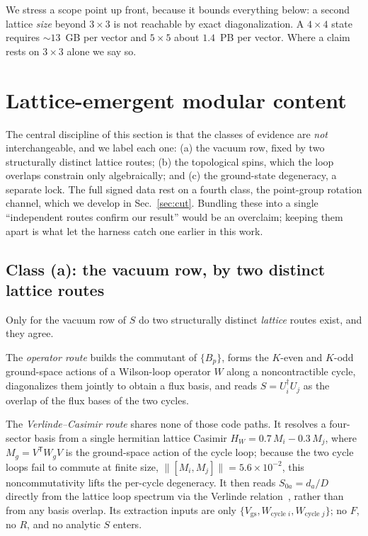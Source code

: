 \documentclass[aps,pra,twocolumn,superscriptaddress,longbibliography,floatfix,nofootinbib]{revtex4-2}
\begin{document}
We stress a scope point up front, because it bounds everything below: a second
lattice \emph{size} beyond $3\times3$ is not reachable by exact
diagonalization. A $4\times4$ state requires ${\sim}13$~GB per vector and
$5\times5$ about $1.4$~PB per vector. Where a claim rests on $3\times3$ alone
we say so.

\section{Lattice-emergent modular content}
\label{sec:c1}

The central discipline of this section is that the classes of evidence are
\emph{not} interchangeable, and we label each one: (a) the vacuum row, fixed by
two structurally distinct lattice routes; (b) the topological spins, which the
loop overlaps constrain only algebraically; and (c) the ground-state
degeneracy, a separate lock. The full signed data rest on a fourth class, the
point-group rotation channel, which we develop in Sec.~\ref{sec:cut}. Bundling
these into a single ``independent routes confirm our result'' would be an
overclaim; keeping them apart is what let the harness catch one earlier in this
work.

\subsection{Class (a): the vacuum row, by two distinct lattice routes}
\label{sec:classa}

Only for the vacuum row of $S$ do two structurally distinct \emph{lattice}
routes exist, and they agree.

The \emph{operator route} builds the commutant of $\{B_p\}$, forms the
$K$-even and $K$-odd ground-space actions of a Wilson-loop operator $W$ along a
noncontractible cycle, diagonalizes them jointly to obtain a flux basis, and
reads $S=U_i^{\dagger}U_j$ as the overlap of the flux bases of the two cycles.

The \emph{Verlinde--Casimir route} shares none of those code paths. It resolves
a four-sector basis from a single hermitian lattice Casimir
$H_W = 0.7\,M_i - 0.3\,M_j$, where $M_g=V^{\mathsf T}W_gV$ is the ground-space
action of the cycle loop; because the two cycle loops fail to commute at finite
size, $\lVert[M_i,M_j]\rVert = 5.6\times10^{-2}$, this noncommutativity lifts
the per-cycle degeneracy. It then reads $S_{0a}=d_a/D$ directly from the
lattice loop spectrum via the Verlinde relation~\cite{Verlinde1988}, rather
than from any basis overlap. Its extraction inputs are only
$\{V_{\mathrm{gs}}, W_{\text{cycle }i}, W_{\text{cycle }j}\}$; no $F$, no $R$,
and no analytic $S$ enters.
\end{document}
